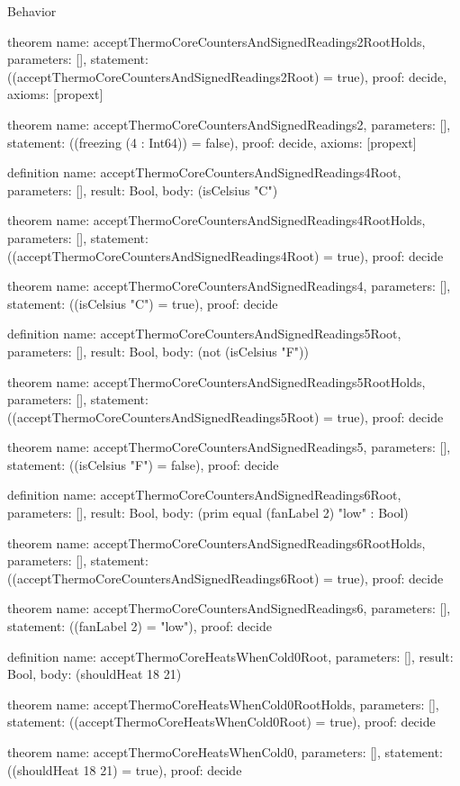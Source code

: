 \begin{lexlean}{Behavior}
\begin{semanticmodule}
theorem{
  name: acceptThermoCoreCountersAndSignedReadings2RootHolds,
  parameters: [],
  statement: ((acceptThermoCoreCountersAndSignedReadings2Root) = true),
  proof: decide{},
  axioms: [propext]
}

theorem{
  name: acceptThermoCoreCountersAndSignedReadings2,
  parameters: [],
  statement: ((freezing (4 : Int64)) = false),
  proof: decide{},
  axioms: [propext]
}

definition{
  name: acceptThermoCoreCountersAndSignedReadings4Root,
  parameters: [],
  result: Bool,
  body: (isCelsius "C")
}

theorem{
  name: acceptThermoCoreCountersAndSignedReadings4RootHolds,
  parameters: [],
  statement: ((acceptThermoCoreCountersAndSignedReadings4Root) = true),
  proof: decide{}
}

theorem{
  name: acceptThermoCoreCountersAndSignedReadings4,
  parameters: [],
  statement: ((isCelsius "C") = true),
  proof: decide{}
}

definition{
  name: acceptThermoCoreCountersAndSignedReadings5Root,
  parameters: [],
  result: Bool,
  body: (not (isCelsius "F"))
}

theorem{
  name: acceptThermoCoreCountersAndSignedReadings5RootHolds,
  parameters: [],
  statement: ((acceptThermoCoreCountersAndSignedReadings5Root) = true),
  proof: decide{}
}

theorem{
  name: acceptThermoCoreCountersAndSignedReadings5,
  parameters: [],
  statement: ((isCelsius "F") = false),
  proof: decide{}
}

definition{
  name: acceptThermoCoreCountersAndSignedReadings6Root,
  parameters: [],
  result: Bool,
  body: (prim equal (fanLabel 2) "low" : Bool)
}

theorem{
  name: acceptThermoCoreCountersAndSignedReadings6RootHolds,
  parameters: [],
  statement: ((acceptThermoCoreCountersAndSignedReadings6Root) = true),
  proof: decide{}
}

theorem{
  name: acceptThermoCoreCountersAndSignedReadings6,
  parameters: [],
  statement: ((fanLabel 2) = "low"),
  proof: decide{}
}

definition{
  name: acceptThermoCoreHeatsWhenCold0Root,
  parameters: [],
  result: Bool,
  body: (shouldHeat 18 21)
}

theorem{
  name: acceptThermoCoreHeatsWhenCold0RootHolds,
  parameters: [],
  statement: ((acceptThermoCoreHeatsWhenCold0Root) = true),
  proof: decide{}
}

theorem{
  name: acceptThermoCoreHeatsWhenCold0,
  parameters: [],
  statement: ((shouldHeat 18 21) = true),
  proof: decide{}
}


\end{semanticmodule}
\end{lexlean}

